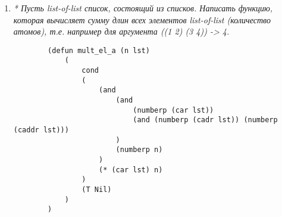 \begin{enumerate}[wide=0pt]
	\item  \textit{* Пусть list-of-list список, состоящий из списков. Написать функцию, которая
	вычисляет сумму длин всех элементов list-of-list (количество атомов), т.е. например
	для аргумента
	 ((1 2) (3 4)) -> 4.}

	\begin{lstlisting}
		(defun mult_el_a (n lst)
			(
				cond 
				(
					(and
						(and
							(numberp (car lst))
							(and (numberp (cadr lst)) (numberp (caddr lst)))
						)
						(numberp n)
					)
					(* (car lst) n)
				)
				(T Nil)
			)
		)
	\end{lstlisting}


\end{enumerate}